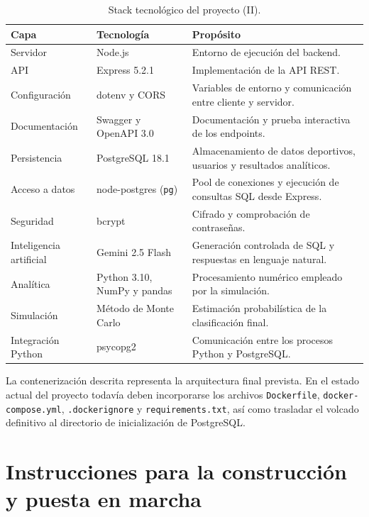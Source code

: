 \begin{table}[H]
\centering
\caption{Stack tecnol\'ogico del proyecto (II).}
\label{tab:stack-tecnologico-2}
\begin{tabular}{|p{2.8cm}|p{4cm}|p{6cm}|}
\hline
\textbf{Capa} & \textbf{Tecnolog\'ia} & \textbf{Prop\'osito} \\
\hline
Servidor & Node.js & Entorno de ejecuci\'on del backend. \\
\hline
API & Express 5.2.1 & Implementaci\'on de la API REST. \\
\hline
Configuraci\'on & dotenv y CORS & Variables de entorno y comunicaci\'on entre cliente y servidor. \\
\hline
Documentaci\'on & Swagger y OpenAPI 3.0 & Documentaci\'on y prueba interactiva de los endpoints. \\
\hline
Persistencia & PostgreSQL 18.1 & Almacenamiento de datos deportivos, usuarios y resultados anal\'iticos. \\
\hline
Acceso a datos & node-postgres (\texttt{pg}) & Pool de conexiones y ejecuci\'on de consultas SQL desde Express. \\
\hline
Seguridad & bcrypt & Cifrado y comprobaci\'on de contrase\~nas. \\
\hline
Inteligencia artificial & Gemini 2.5 Flash & Generaci\'on controlada de SQL y respuestas en lenguaje natural. \\
\hline
Anal\'itica & Python 3.10, NumPy y pandas & Procesamiento num\'erico empleado por la simulaci\'on. \\
\hline
Simulaci\'on & M\'etodo de Monte Carlo & Estimaci\'on probabil\'istica de la clasificaci\'on final. \\
\hline
Integraci\'on Python & psycopg2 & Comunicaci\'on entre los procesos Python y PostgreSQL. \\
\hline
\end{tabular}
\end{table}

La contenerizaci\'on descrita representa la arquitectura final prevista. En el
estado actual del proyecto todav\'ia deben incorporarse los archivos
\texttt{Dockerfile}, \texttt{docker-compose.yml}, \texttt{.dockerignore} y
\texttt{requirements.txt}, as\'i como trasladar el volcado definitivo al
directorio de inicializaci\'on de PostgreSQL.

\section{Instrucciones para la construcci\'on y puesta en marcha}

